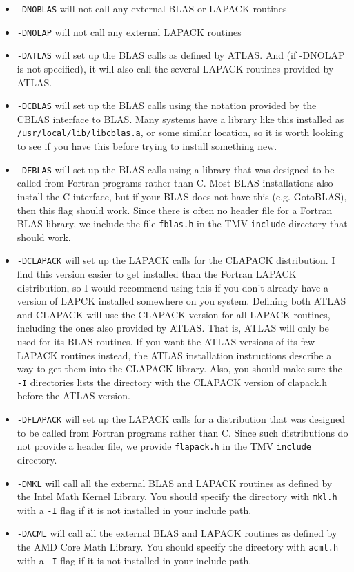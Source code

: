 \documentclass[twoside,letterpaper,11pt]{article}
\begin{document}
\begin{itemize}
\item
\texttt{-DNOBLAS} will not call any external BLAS or LAPACK routines
\item
\texttt{-DNOLAP} will not call any external LAPACK routines
\item
\texttt{-DATLAS} will set up the BLAS calls as defined by ATLAS.  And (if -DNOLAP
is not specified), it will also call the several LAPACK routines
provided by ATLAS.
\item
\texttt{-DCBLAS} will set up the BLAS calls using the notation provided by the 
CBLAS interface to BLAS.  Many systems have a library like this installed as 
\texttt{/usr/local/lib/libcblas.a}, or some similar location,
so it is worth looking to see if you have this before
trying to install something new.
\item
\texttt{-DFBLAS} will set up the BLAS calls using a library that was designed to be called
from Fortran programs rather than C.  
Most BLAS installations also install the C interface, but if your
BLAS does not have this (e.g. GotoBLAS), then this flag should work.  
Since there is often no
header file for a Fortran BLAS library, we include the file \texttt{fblas.h} in the TMV 
\texttt{include} directory that should work.
\item
\texttt{-DCLAPACK} will set up the LAPACK calls for the CLAPACK distribution.  I 
find this version easier to get installed than the Fortran LAPACK distribution,
so I would recommend using this if you don't already have a version of LAPCK
installed somewhere on you system.  
Defining both ATLAS and CLAPACK will use
the CLAPACK version for all LAPACK routines, including the ones also provided by 
ATLAS.  That is, ATLAS will only be used for its BLAS routines.  If you want
the ATLAS versions of its few LAPACK routines instead, the ATLAS 
installation instructions describe a way to get them into the CLAPACK library.
Also, you should make sure the \texttt{-I} directories lists the directory with the CLAPACK
version of clapack.h before the ATLAS version.
\item
\texttt{-DFLAPACK} will set up the LAPACK calls for a distribution that
was designed to be called from Fortran programs rather than C.  Since such distributions
do not provide a header file, we provide \texttt{flapack.h} in the TMV \texttt{include} directory.
\item
\texttt{-DMKL} will call all the external BLAS and LAPACK routines as defined by the
Intel Math Kernel Library.  You should specify the directory with \texttt{mkl.h} with a 
\texttt{-I} flag if it is not installed in your include path.
\item
\texttt{-DACML} will call all the external BLAS and LAPACK routines as defined by the 
AMD Core Math Library.  You should specify the directory with \texttt{acml.h} with a 
\texttt{-I} flag if it is not installed in your include path.
\end{itemize}
\end{document}

